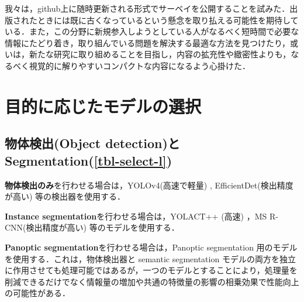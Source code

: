 \documentclass[originalpaper]{jsaiart}     %
\begin{document}
我々は，github上に随時更新される形式でサーベイを公開することを試みた．出版されたときには既に古くなっているという懸念を取り払える可能性を期待している．また，この分野に新規参入しようとしている人がなるべく短時間で必要な情報にたどり着き，取り組んでいる問題を解決する最適な方法を見つけたり，或いは，新たな研究に取り組めることを目指し，内容の拡充性や緻密性よりも，なるべく視覚的に解りやすいコンパクトな内容になるよう心掛けた．

\section{目的に応じたモデルの選択}
\subsection{物体検出(Object detection)と Segmentation(\ref{tbl-select-l})}
{\bf 物体検出のみ}を行わせる場合は，YOLOv4(高速で軽量) \cite{BWL20}, EfficientDet(検出精度が高い) \cite{TPL20}等の検出器を使用する．

{\bf Instance segmentation}を行わせる場合は，YOLACT++ (高速) \cite{BZXL20}，MS R-CNN(検出精度が高い) \cite{HHGHW19} 等のモデルを使用する．

{\bf Panoptic segmentation}を行わせる場合は，Panoptic segmentation 用のモデル\cite{KHGRD19}を使用する．これは，物体検出器と semantic segmentation モデルの両方を独立に作用させても処理可能ではあるが，一つのモデルとすることにより，処理量を削減できるだけでなく情報量の増加や共通の特徴量の影響の相乗効果で性能向上の可能性がある．
\end{document}
